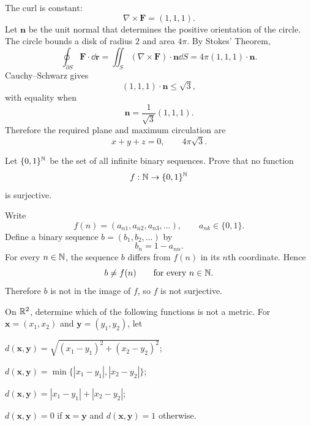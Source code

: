     \begin{solution}
        The curl is constant:
        \[
            \nabla\times\mathbf{F}
            =
            (1,1,1).
        \]
        Let $\mathbf{n}$ be the unit normal that determines the positive
        orientation of the circle. The circle bounds a disk of radius $2$ and
        area $4\pi$. By Stokes' Theorem,
        \[
            \oint_{\partial S}\mathbf{F}\cdot\dd\mathbf{r}
            =
            \iint_S
            (\nabla\times\mathbf{F})\cdot\mathbf{n}\dd S
            =
            4\pi(1,1,1)\cdot\mathbf{n}.
        \]
        Cauchy--Schwarz gives
        \[
            (1,1,1)\cdot\mathbf{n}
            \leq
            \sqrt{3},
        \]
        with equality when
        \[
            \mathbf{n}
            =
            \frac{1}{\sqrt3}(1,1,1).
        \]
        Therefore the required plane and maximum circulation are
        \[
            \boxed{x+y+z=0},
            \qquad
            \boxed{4\pi\sqrt3}.
        \]
    \end{solution}

    \begin{expectedproblem}
        Let $\{0,1\}^{\mathbb{N}}$ be the set of all infinite binary sequences. Prove
        that no function
        \[
            f:\mathbb{N}\to\{0,1\}^{\mathbb{N}}
        \]
        is surjective.
    \end{expectedproblem}

    \begin{solution}
        Write
        \[
            f(n)=(a_{n1},a_{n2},a_{n3},\ldots),
            \qquad
            a_{nk}\in\{0,1\}.
        \]
        Define a binary sequence $b=(b_1,b_2,\ldots)$ by
        \[
            b_n=1-a_{nn}.
        \]
        For every $n\in\mathbb{N}$, the sequence $b$ differs from $f(n)$ in its
        $n$th coordinate. Hence
        \[
            b\neq f(n)
            \qquad
            \text{for every }n\in\mathbb{N}.
        \]
        Therefore $b$ is not in the image of $f$, so $f$ is not surjective.
    \end{solution}

    \begin{expectedproblem}
        On $\mathbb{R}^2$, determine which of the following functions is not a metric.
        For $\mathbf{x}=(x_1,x_2)$ and $\mathbf{y}=(y_1,y_2)$, let
        \begin{problemchoices}
            \item $d(\mathbf{x},\mathbf{y})
                  =\sqrt{(x_1-y_1)^2+(x_2-y_2)^2}$;
            \item $d(\mathbf{x},\mathbf{y})
                  =\min\{|x_1-y_1|,|x_2-y_2|\}$;
            \item $d(\mathbf{x},\mathbf{y})
                  =|x_1-y_1|+|x_2-y_2|$;
            \item $d(\mathbf{x},\mathbf{y})=0$ if $\mathbf{x}=\mathbf{y}$ and
                  $d(\mathbf{x},\mathbf{y})=1$ otherwise.
        \end{problemchoices}
    \end{expectedproblem}

